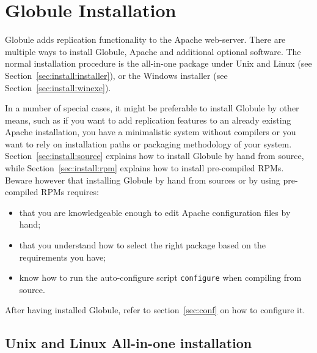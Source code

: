 \documentclass[10pt,a4paper]{article}
\makeatletter
\newenvironment{p}{\@open{P}{}}{\@close{P}}
\newenvironment{p}{}{\par}
\newcommand\sectionbr{}
\newcommand\subsectionbr{}
\makeatother
\begin{document}
\newpage
\section{\label{sec:install}Globule Installation\sectionbr}

\begin{p}
Globule adds replication functionality to the Apache web-server.  There are
multiple ways to install Globule, Apache and additional optional software.
The normal installation procedure is the all-in-one package under Unix and
Linux (see Section~\ref{sec:install:installer}), or the Windows installer (see
Section~\ref{sec:install:winexe}).
\end{p}

\begin{p}
In a number of special cases, it might be preferable to install Globule by
other means, such as if you want to add replication features to an already
existing Apache installation, you have a minimalistic system without compilers
or you want to rely on installation paths or packaging methodology of your
system.  Section~\ref{sec:install:source} explains how to install Globule by
hand from source, while Section~\ref{sec:install:rpm} explains how to install
pre-compiled RPMs.  Beware however that installing Globule by hand from
sources or by using pre-compiled RPMs requires:
\end{p}

\begin{p}
\begin{itemize}
\item that you are knowledgeable enough to edit Apache configuration files by
      hand;
\item that you understand how to select the right package based on the
      requirements you have;
\item know how to run the auto-configure script \texttt{configure} when
      compiling from source.
\end{itemize}
\end{p}

\begin{p}
After having installed Globule, refer to section~\ref{sec:conf} on how to
configure it.
\end{p}


\newpage
\subsection{\label{sec:install:installer}
  Unix and Linux All-in-one installation\subsectionbr}
\end{document}
